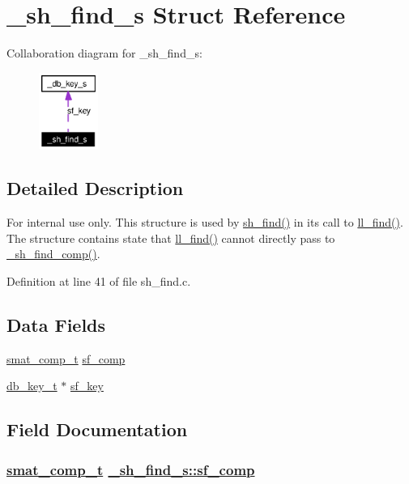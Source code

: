 \hypertarget{struct__sh__find__s}{
\section{\_\-sh\_\-find\_\-s Struct Reference}
\label{struct__sh__find__s}
}
Collaboration diagram for \_\-sh\_\-find\_\-s:\begin{figure}[H]
\begin{center}
\leavevmode
\includegraphics[width=55pt]{struct__sh__find__s__coll__graph}
\end{center}
\end{figure}


\subsection{Detailed Description}
\begin{Desc}
\item[For internal use only.]
This structure is used by \hyperlink{group__dbprim__smat_ga22}{sh\_\-find()} in its call to \hyperlink{group__dbprim__link_ga9}{ll\_\-find()}. The structure contains state that \hyperlink{group__dbprim__link_ga9}{ll\_\-find()} cannot directly pass to \hyperlink{group__dbprim__smat_ga27}{\_\-sh\_\-find\_\-comp()}.\end{Desc}




Definition at line 41 of file sh\_\-find.c.\subsection*{Data Fields}
\begin{CompactItemize}
\item 
\hyperlink{group__dbprim__smat_ga5}{smat\_\-comp\_\-t} \hyperlink{struct__sh__find__s_o0}{sf\_\-comp}
\item 
\hyperlink{struct__db__key__s}{db\_\-key\_\-t} $\ast$ \hyperlink{struct__sh__find__s_o1}{sf\_\-key}
\end{CompactItemize}


\subsection{Field Documentation}
\hypertarget{struct__sh__find__s_o0}{
\subsubsection[sf\_\-comp]{\setlength{\rightskip}{0pt plus 5cm}\hyperlink{group__dbprim__smat_ga5}{smat\_\-comp\_\-t} \hyperlink{struct__sh__find__s_o0}{\_\-sh\_\-find\_\-s::sf\_\-comp}}}
\label{struct__sh__find__s_o0}


